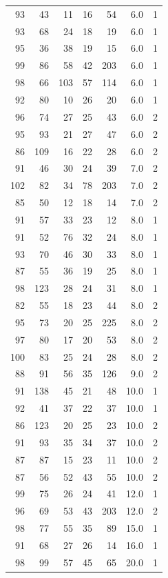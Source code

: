 \documentclass[
  11pt,
  a4paper,
]{scrartcl}
\begin{document}
\begin{longtable}[]{@{}rrrrrrl@{}}
93 & 43 & 11 & 16 & 54 & 6.0 & 1 \\
93 & 68 & 24 & 18 & 19 & 6.0 & 1 \\
95 & 36 & 38 & 19 & 15 & 6.0 & 1 \\
99 & 86 & 58 & 42 & 203 & 6.0 & 1 \\
98 & 66 & 103 & 57 & 114 & 6.0 & 1 \\
92 & 80 & 10 & 26 & 20 & 6.0 & 1 \\
96 & 74 & 27 & 25 & 43 & 6.0 & 2 \\
95 & 93 & 21 & 27 & 47 & 6.0 & 2 \\
86 & 109 & 16 & 22 & 28 & 6.0 & 2 \\
91 & 46 & 30 & 24 & 39 & 7.0 & 2 \\
102 & 82 & 34 & 78 & 203 & 7.0 & 2 \\
85 & 50 & 12 & 18 & 14 & 7.0 & 2 \\
91 & 57 & 33 & 23 & 12 & 8.0 & 1 \\
91 & 52 & 76 & 32 & 24 & 8.0 & 1 \\
93 & 70 & 46 & 30 & 33 & 8.0 & 1 \\
87 & 55 & 36 & 19 & 25 & 8.0 & 1 \\
98 & 123 & 28 & 24 & 31 & 8.0 & 1 \\
82 & 55 & 18 & 23 & 44 & 8.0 & 2 \\
95 & 73 & 20 & 25 & 225 & 8.0 & 2 \\
97 & 80 & 17 & 20 & 53 & 8.0 & 2 \\
100 & 83 & 25 & 24 & 28 & 8.0 & 2 \\
88 & 91 & 56 & 35 & 126 & 9.0 & 2 \\
91 & 138 & 45 & 21 & 48 & 10.0 & 1 \\
92 & 41 & 37 & 22 & 37 & 10.0 & 1 \\
86 & 123 & 20 & 25 & 23 & 10.0 & 2 \\
91 & 93 & 35 & 34 & 37 & 10.0 & 2 \\
87 & 87 & 15 & 23 & 11 & 10.0 & 2 \\
87 & 56 & 52 & 43 & 55 & 10.0 & 2 \\
99 & 75 & 26 & 24 & 41 & 12.0 & 1 \\
96 & 69 & 53 & 43 & 203 & 12.0 & 2 \\
98 & 77 & 55 & 35 & 89 & 15.0 & 1 \\
91 & 68 & 27 & 26 & 14 & 16.0 & 1 \\
98 & 99 & 57 & 45 & 65 & 20.0 & 1 \\
\bottomrule
\end{longtable}
\end{document}
